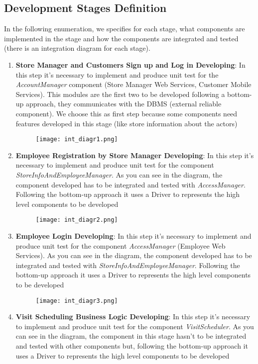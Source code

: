     \subsection{Development Stages Definition}
    In the following enumeration, we specifies for each stage, what components are implemented in the stage and how the components are integrated and tested (there is an integration diagram for each stage).        
    \begin{enumerate}
            \item \textbf{Store Manager and Customers Sign up and Log in Developing}: In this step it's necessary to implement and produce unit test for the \textit{AccountManager} component (Store Manager Web Services, Customer Mobile Services). This modules are the first two to be developed following a bottom-up approach, they communicates with the DBMS (external reliable component). We choose this as first step because some components need features developed in this stage (like store information about the actors) \begin{figure}[H]
                \centering
                \texttt{[image: int\_diagr1.png]}
            \end{figure}
            \item \textbf{Employee Registration by Store Manager Developing}: In this step it's necessary to implement and produce unit test for the component \textit{StoreInfoAndEmployeeManager}. As you can see in the diagram, the component developed has to be integrated and tested with \textit{AccessManager}. Following the bottom-up approach it uses a Driver to represents the high level components to be developed  \begin{figure}[H]
                \centering
                \texttt{[image: int\_diagr2.png]}
            \end{figure}
            \item \textbf{Employee Login Developing}: In this step it's necessary to implement and produce unit test for the component \textit{AccessManager} (Employee Web Services). As you can see in the diagram, the component developed has to be integrated and tested with \textit{StoreInfoAndEmployeeManager}. Following the bottom-up approach it uses a Driver to represents the high level components to be developed \begin{figure}[H]
                \centering
                \texttt{[image: int\_diagr3.png]}
            \end{figure}
            \item \textbf{Visit Scheduling Business Logic Developing}: In this step it's necessary to implement and produce unit test for the component \textit{VisitScheduler}. As you can see in the diagram, the component in this stage hasn't to be integrated and tested with other components but, following the bottom-up approach it uses a Driver to represents the high level components to be developed \begin{figure}[H]

\end{figure}
\end{enumerate}
